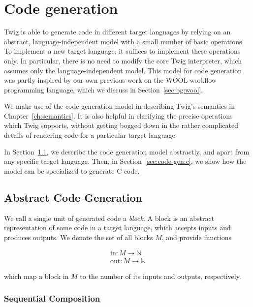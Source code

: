 
\chapter{Code generation}
\label{ch:code-gen}

Twig is able to generate code in different target languages by
relying on an abstract, language-independent model with a small
number of basic operations. To implement a new target language, it
suffices to implement these operations only. In particular, there
is no need to modify the core Twig interpreter, which assumes only
the language-independent model. This model for code generation was
partly inspired by our own previous work on the WOOL workflow
programming language, which we discuss in
Section~\ref{sec:bg:wool}.

We make use of the code generation model in describing Twig's
semantics in Chapter~\ref{ch:semantics}. It is also helpful in
clarifying the precise operations which Twig supports, without
getting bogged down in the rather complicated details of rendering
code for a particular target language.

In Section~\ref{sec:code-gen:abstract}, we describe the code
generation model abstractly, and apart from any specific target
language. Then, in Section~\ref{sec:code-gen:c}, we show how the
model can be specialized to generate C code.

\section{Abstract Code Generation}
\label{sec:code-gen:abstract}

We call a single unit of generated code a \emph{block}. A block is
an abstract representation of some code in a target language,
which accepts inputs and produces outputs. We denote the 
set of all blocks $M$, and provide functions 

\begin{eqnarray*}
\mbox{in} : M \to \mathbb{N}\\
\mbox{out} : M \to \mathbb{N}
\end{eqnarray*}

which map a block in $M$ to the number of its inputs and outputs,
respectively.

\subsection{Sequential Composition}
\label{sec:code-gen:seq}

